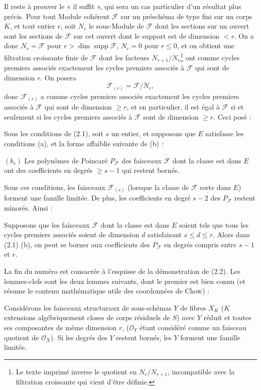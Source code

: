 Il reste à prouver le « il suffit », qui sera un cas particulier d'un résultat
plus précis. Pour tout Module cohérent $\mathcal F$ sur un préschéma de type
fini sur un corps $K$, et tout entier $r$, soit $N_r$ le sous-Module de
$\mathcal F$ dont les sections sur un ouvert sont les sections de $\mathcal F$
sur cet ouvert dont le support est de dimension $<r$. On a donc
$N_r=\mathcal F$ pour $r>\dim\operatorname{supp}\mathcal F$, $N_r=0$ pour
$r\leq0$, et on obtient une filtration croissante finie de $\mathcal F$ dont
les facteurs $N_{r+1}/N_r$\footnote{Le texte imprimé inverse le quotient en
$N_r/N_{r+1}$, incompatible avec la filtration croissante qui vient d'être
définie.} ont comme cycles premiers associés exactement les cycles premiers
associés à $\mathcal F$ qui sont de dimension $r$. On posera
\[
\mathcal F_{(r)}=\mathcal F/N_r,
\]
donc $\mathcal F_{(r)}$ a comme cycles premiers associés exactement les cycles
premiers associés à $\mathcal F$ qui sont de dimension $\geq r$, et en
particulier, il est égal à $\mathcal F$ si et seulement si les cycles premiers
associés à $\mathcal F$ sont de dimension $\geq r$. Ceci posé :

 Sous les conditions de (2.1), soit $s$ un entier, et
supposons que $E$ satisfasse les conditions (a), et la forme affaiblie suivante
de (b) :

\medskip
\noindent $(b_s)$ Les polynômes de Poincaré $P_{\mathcal F}$ des faisceaux
$\mathcal F$ dont la classe est dans $E$ ont des coefficients en degrés
$\geq s-1$ qui restent bornés.

Sous ces conditions, les faisceaux $\mathcal F_{(s)}$ (lorsque la classe de
$\mathcal F$ reste dans $E$) forment une famille limitée. De plus, les
coefficients en degré $s-2$ des $P_{\mathcal F}$ restent minorés.
Ainsi :

 Supposons que les faisceaux $\mathcal F$ dont la classe
est dans $E$ soient tels que tous les cycles premiers associés soient de
dimension $d$ satisfaisant $s\leq d\leq r$. Alors dans (2.1) (b), on peut se
borner aux coefficients des $P_{\mathcal F}$ en degrés compris entre $s-1$ et
$r$.

La fin du numéro est consacrée à l'esquisse de la démonstration de (2.2). Les
lemmes-clefs sont les deux lemmes suivants, dont le premier est bien connu (et
résume le contenu mathématique utile des coordonnées de Chow) :

 Considérons les faisceaux structuraux de
sous-schémas $Y$ de fibres $X_K$ ($K$ extensions algébriquement closes de corps
résiduels de $S$) avec $Y$ réduit et toutes ses composantes de même dimension
$r$, ($\mathcal O_Y$ étant considéré comme un faisceau quotient de
$\mathcal O_X$). Si les degrés des $Y$ restent bornés, les $Y$ forment une
famille limitée.

